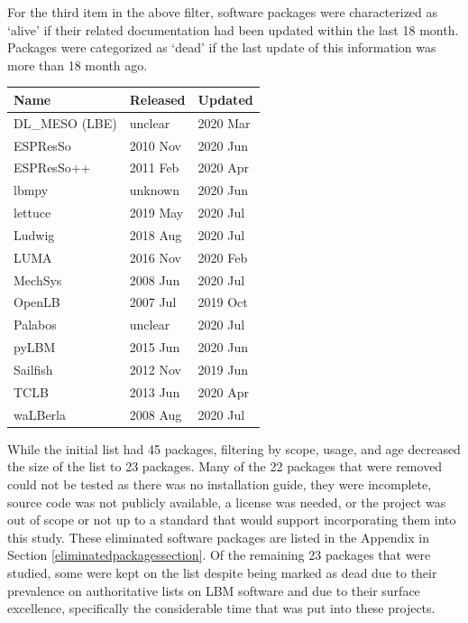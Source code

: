 \documentclass[12pt, notitlepage]{article}
\begin{document}
For the third item in the above filter, software packages were characterized as `alive' if their related documentation had been updated within
the last 18 month. Packages were categorized as `dead' if the last update of this information was more than 18 month ago.\\ 

\begin{onehalfspacing}
\begin{center}
	\begin{tabular}{ p{4cm}p{3cm}p{3cm} }
		\hline
		Name & Released & Updated\\
		\hline
		DL\_MESO (LBE) & unclear & 2020 Mar\\
		ESPResSo & 2010 Nov & 2020 Jun\\
		ESPResSo++ & 2011 Feb & 2020 Apr\\
		lbmpy& unknown  & 2020 Jun  \\
		lettuce & 2019 May & 2020 Jul\\
		Ludwig& 2018 Aug & 2020 Jul\\
		LUMA& 2016 Nov   & 2020 Feb\\
		MechSys & 2008 Jun    & 2020 Jul\\
		OpenLB & 2007 Jul & 2019 Oct\\
		Palabos & unclear & 2020 Jul\\
		pyLBM & 2015 Jun&   2020 Jun\\
		Sailfish & 2012 Nov & 2019 Jun\\
		TCLB & 2013 Jun  & 2020 Apr\\
		waLBerla & 2008 Aug & 2020 Jul\\
		\hline
	\end{tabular}
	\label{alivepackages}
\end{center}
\end{onehalfspacing}

While the initial list had 45 packages, filtering by scope, usage, and age decreased the size of the list to 23 packages. Many of the 22 packages that were removed could not be tested as there was no installation guide, they were incomplete, source code was not publicly available, a license was needed, or the project was out of scope or not up to a standard that would support incorporating them into this study. These eliminated software packages are listed in the Appendix in Section \ref{eliminatedpackagessection}. Of the remaining 23 packages that were studied, some were kept on the list despite being marked as dead due to their prevalence on authoritative lists on LBM software and due to their surface excellence, specifically the considerable time that was put into these projects.  
\end{document}
